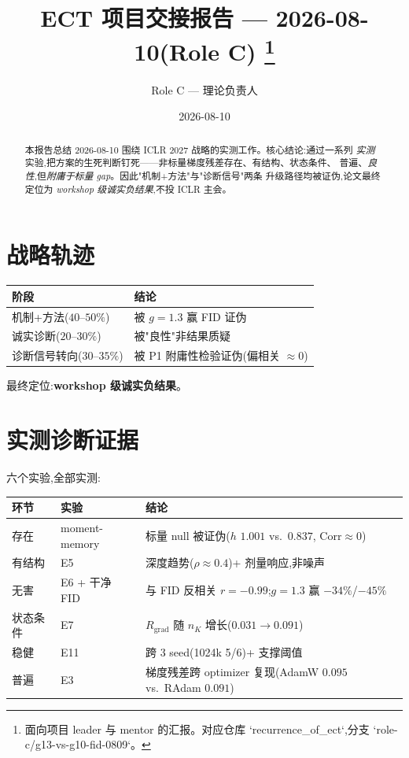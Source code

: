 \documentclass[UTF8,11pt,a4paper]{ctexart}
\title{\textbf{ECT 项目交接报告 — 2026-08-10(Role C)}%
\thanks{面向项目 leader 与 mentor 的汇报。对应仓库 `recurrence\_of\_ect`,分支
`role-c/g13-vs-g10-fid-0809`。}}
\author{Role C --- 理论负责人}
\date{2026-08-10}
\begin{document}
\maketitle

\begin{abstract}
本报告总结 2026-08-10 围绕 ICLR 2027 战略的实测工作。核心结论:通过一系列
\emph{实测}实验,把方案的生死判断钉死——非标量梯度残差存在、有结构、状态条件、
普遍、\emph{良性},但\emph{附庸于标量 gap}。因此"机制+方法"与"诊断信号"两条
升级路径均被证伪,论文最终定位为 \emph{workshop 级诚实负结果},不投 ICLR 主会。
\end{abstract}

\tableofcontents

\section{战略轨迹}
\label{sec:trajectory}

\begin{center}
\begin{tabular}{@{}ll@{}}
\toprule
阶段 & 结论 \\
\midrule
机制+方法($40$--$50\%$) & 被 $g{=}1.3$ 赢 FID 证伪 \\
诚实诊断($20$--$30\%$) & 被"良性"非结果质疑 \\
诊断信号转向($30$--$35\%$) & 被 P1 附庸性检验证伪(偏相关 $\approx 0$) \\
\bottomrule
\end{tabular}
\end{center}

最终定位:\textbf{workshop 级诚实负结果}。

\section{实测诊断证据}
\label{sec:evidence}

六个实验,全部实测:

\begin{center}
\begin{tabular}{@{}lll@{}}
\toprule
环节 & 实验 & 结论 \\
\midrule
存在 & moment-memory & 标量 null 被证伪($h$ $1.001$ vs.\ $0.837$, $\mathrm{Corr}\approx 0$) \\
有结构 & E5 & 深度趋势($\rho\approx 0.4$)+ 剂量响应,非噪声 \\
无害 & E6 + 干净 FID & 与 FID 反相关 $r{=}{-}0.99$;$g{=}1.3$ 赢 $-34\%$/$-45\%$ \\
状态条件 & E7 & $R_{\mathrm{grad}}$ 随 $n_K$ 增长($0.031\to0.091$) \\
稳健 & E11 & 跨 3 seed(1024k 5/6)+ 支撑阈值 \\
普遍 & E3 & 梯度残差跨 optimizer 复现(AdamW $0.095$ vs.\ RAdam $0.091$) \\
\bottomrule
\end{tabular}
\end{center}
\end{document}

